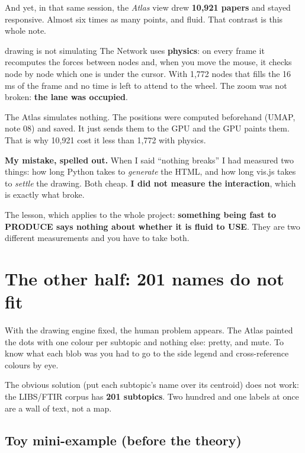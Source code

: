 \documentclass[11pt,a4paper]{article}
\begin{document}
And yet, in that same session, the \emph{Atlas} view drew \textbf{10,921 papers} and stayed
responsive. Almost six times as many points, and fluid. That contrast is this whole note.

\begin{concepto}{drawing is not simulating}
The Network uses \textbf{physics}: on every frame it recomputes the forces between nodes and,
when you move the mouse, it checks node by node which one is under the cursor. With 1,772 nodes
that fills the 16 ms of the frame and no time is left to attend to the wheel. The zoom was not
broken: \textbf{the lane was occupied}.

The Atlas simulates nothing. The positions were computed beforehand (UMAP, note 08) and saved.
It just sends them to the GPU and the GPU paints them. That is why 10,921 cost it less than
1,772 with physics.
\end{concepto}

\begin{ojo}
\textbf{My mistake, spelled out.} When I said ``nothing breaks'' I had measured two things: how long Python takes to
\emph{generate} the HTML, and how long vis.js takes to \emph{settle} the drawing. Both cheap.
\textbf{I did not measure the interaction}, which is exactly what broke.

The lesson, which applies to the whole project: \textbf{something being fast to PRODUCE says
nothing about whether it is fluid to USE}. They are two different measurements and you have to
take both.
\end{ojo}

\section{The other half: 201 names do not fit}

With the drawing engine fixed, the human problem appears. The Atlas painted the dots with one
colour per subtopic and nothing else: pretty, and mute. To know what each blob was you had to
go to the side legend and cross-reference colours by eye.

The obvious solution (put each subtopic's name over its centroid) does not work: the LIBS/FTIR
corpus has \textbf{201 subtopics}. Two hundred and one labels at once are a wall of text, not a
map.

\subsection{Toy mini-example (before the theory)}
\end{document}
